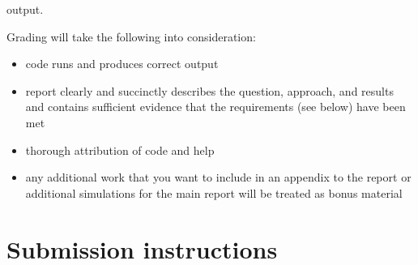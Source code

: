 \documentclass[letterpaper]{scrartcl}
\begin{document}
\begin{framed}
\begin{itemize}
    output.
  \end{itemize}
  Grading will take the following into consideration:
  \begin{itemize}
  \item code runs and produces correct output
  \item report clearly and succinctly describes the question,
    approach, and results and contains sufficient evidence that the
    requirements (see below) have been met
  \item thorough attribution of code and help
  \item any additional work that you want to include in an appendix to
    the report or additional simulations for the main report will be
    treated as bonus material
  \end{itemize}
\end{framed}

\section{Submission instructions}
\end{document}

